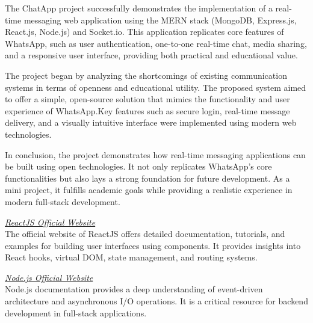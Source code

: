 \documentclass[12pt,a4paper]{report}
\begin{document}
\renewcommand\bibname{
	\Huge \textbf{CONCLUSION}}
\begin{thebibliography}{9}

The ChatApp project successfully demonstrates the implementation of a real-time messaging web application using the MERN stack (MongoDB, Express.js, React.js, Node.js) and Socket.io. This application replicates core features of WhatsApp, such as user authentication, one-to-one real-time chat, media sharing, and a responsive user interface, providing both practical and educational value.

\vspace{1cm}

The project began by analyzing the shortcomings of existing communication systems in terms of openness and educational utility. The proposed system aimed to offer a simple, open-source solution that mimics the functionality and user experience of WhatsApp.Key features such as secure login, real-time message delivery, and a visually intuitive interface were implemented using modern web technologies.

\vspace{1cm}

In conclusion, the project demonstrates how real-time messaging applications can be built using open technologies. It not only replicates WhatsApp's core functionalities but also lays a strong foundation for future development. As a mini project, it fulfills academic goals while providing a realistic experience in modern full-stack development.




\newpage

\renewcommand\bibname{\begin{center}
	\Huge \textbf{REFERENCES}
\end{center}}
\begin{thebibliography}{9}

\textit{\href{https://reactjs.org/}{ReactJS Official Website}}\\
The official website of ReactJS offers detailed documentation, tutorials, and examples for building user interfaces using components. It provides insights into React hooks, virtual DOM, state management, and routing systems.

\textit{\href{https://nodejs.org/}{Node.js Official Website}}\\
Node.js documentation provides a deep understanding of event-driven architecture and asynchronous I/O operations. It is a critical resource for backend development in full-stack applications.


\end{thebibliography}
\end{thebibliography}
\end{document}
